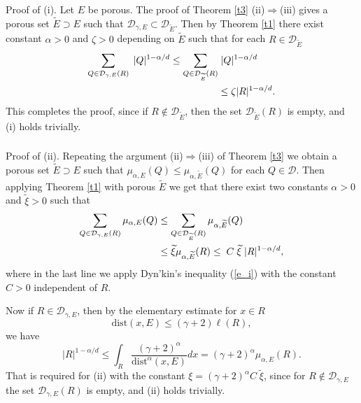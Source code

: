 \documentclass[12pt]{amsart} \setlength{\textwidth}{15cm} \setlength{\textheight}{24cm} \setlength{\voffset}{-1cm} \setlength{\oddsidemargin}{-0.4cm} \setlength{\evensidemargin}{-0.4cm}
\theoremstyle{definition}
\theoremstyle{remark}
\begin{document}
\subsubsection{} Proof of (i).
Let $E$ be porous.
      The proof of Theorem \ref{t3} (ii)$\Rightarrow$(iii) gives a porous set $\widetilde{E} \supset E$ such that  $\mathcal{D}_{\gamma, E}  \subset \mathcal{D}_{\widetilde{E}}$.
   Then by Theorem \ref{t1} there exist constant $\alpha >0$ and $\zeta >0$ depending on $\widetilde{E}$ such that for each $R \in \mathcal{D}_{\widetilde{E}}$
    \[
 \aligned
   \sum_{ Q \in\mathcal{D}_{\gamma, E}(R) } \;|Q|^{1-\alpha/d}
   \leq  \sum_{ Q \in\mathcal{D}_{\widetilde{E}}(R) }& \;|Q|^{1-\alpha/d}\\
    &\leq \zeta |R|^{1-\alpha/d}.
        \endaligned
     \]
 This completes the proof, since if $R \notin \mathcal{D}_{\widetilde{E}}$, then the set  $\mathcal{D}_{\widetilde{E}}(R)$ is empty, and (i) holds trivially.
  \subsubsection{} Proof of (ii). Repeating the argument  (ii)$\Rightarrow$(iii) of Theorem \ref{t3} we obtain  a porous set  $\widetilde{E} \supset E$ such that
     $\mu_{\alpha,E}(Q) \leq \mu_{\alpha,\widetilde{E}}(Q)$ for each $Q \in \mathcal{D}$. Then applying Theorem \ref{t1} with porous $\widetilde{E}$ we get that  there exist two constants $\alpha >0$ and $\widetilde{\xi} >0$ such that
    \[
\aligned
\sum _ {Q \in \mathcal{D}_{\gamma, E}(R)}\mu_{\alpha,E}(Q)
&\leq \sum _ {Q \in \mathcal{D}_{\widetilde{E}}(R)}\mu_{\alpha,\widetilde{E}}(Q)\\
& \leq \widetilde{\xi} \mu_{\alpha,\widetilde{E}}(R)
\leq \;C \;\widetilde{\xi} \; |R|^{1-\alpha /d},\\
 \endaligned
\]
where in the last line we apply Dyn'kin's inequality (\ref{e_i}) with the constant $C>0$ independent of $R$.

  Now if $R \in \mathcal{D}_{\gamma, E}$, then by the elementary estimate for    $x \in R$
  \[\mathrm{dist}(x, E)\leq (\gamma +2)\ell(R),\]
 we have
   \[|R|^{1-\alpha /d}\leq \int_{R} \frac{(\gamma +2)^{\alpha}}{\mathrm{dist}^{\alpha}(x,E)}dx =
    (\gamma +2)^{\alpha}\mu_{\alpha,E}(R).\]
 That is required for (ii) with the constant $\xi=  (\gamma +2)^{\alpha} C \;\widetilde{\xi}$,
 since for $R \notin \mathcal{D}_{\gamma, E}$ the set  $\mathcal{D}_{\gamma, E}(R)$ is empty,
and (ii) holds trivially.
\end{document}
